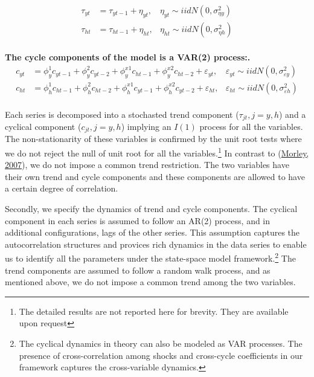 \documentclass[
  12pt,
]{article}
\begin{document}
        \begin{align}
        \tau_{yt} &= \tau_{yt-1} + \eta_{yt}, &\eta_{yt} \sim iidN(0,\sigma^2_{\eta y})
        \\
        \tau_{ht} &= \tau_{ht-1} + \eta_{ht}, &\eta_{ht} \sim iidN(0,\sigma^2_{\eta h}) 
        \end{align}
        \\
        
        \textbf{The cycle components of the model is a VAR(2) process:.}
        \begin{align}
        c_{yt} &= \phi^1_{y}c_{yt-1}  
        + \phi^2_{y}c_{yt-2}  
        + \phi^{x1}_{y}c_{ht-1} + \phi^{x2}_{y}c_{ht-2}
        + \varepsilon_{yt},
        &\varepsilon_{yt} \sim iidN(0,\sigma^2_{\varepsilon y})        
        \\
        c_{ht} &= \phi^1_{h}c_{ht-1}  
        + \phi^2_{h}c_{ht-2}
        + \phi^{x1}_{h}c_{yt-1}  + \phi^{x2}_{h}c_{yt-2}
        + \varepsilon_{ht},
        &\varepsilon_{ht} \sim iidN(0,\sigma^2_{\varepsilon h})
        \end{align}
        \\
        

Each series is decomposed into a stochasted trend component (\(\tau_{jt}, j = y, h\)) and a cyclical component (\(c_{jt}, j = y, h\)) implying an \(I(1)\) process for all the variables. The non-stationarity of these variables is confirmed by the unit root tests where we do not reject the null of unit root for all the variables.\footnote{The detailed results are not reported here for brevity. They are available upon request} In contrast to (\protect\hyperlink{ref-morley_slow_2007}{Morley, 2007}), we do not impose a common trend restriction. The two variables have their own trend and cycle components and these components are allowed to have a certain degree of correlation.

Secondly, we specify the dynamics of trend and cycle components. The cyclical component in each series is assumed to follow an AR(2) process, and in additional configurations, lags of the other series. This assumption captures the autocorrelation structures and provices rich dynamics in the data series to enable us to identify all the parameters under the state-space model framework.\footnote{The cyclical dynamics in theory can also be modeled as VAR processes. The presence of cross-correlation among shocks and cross-cycle coefficients in our framework captures the cross-variable dynamics.} The trend components are assumed to follow a random walk process, and as mentioned above, we do not impose a common trend among the two variables.
\end{document}
